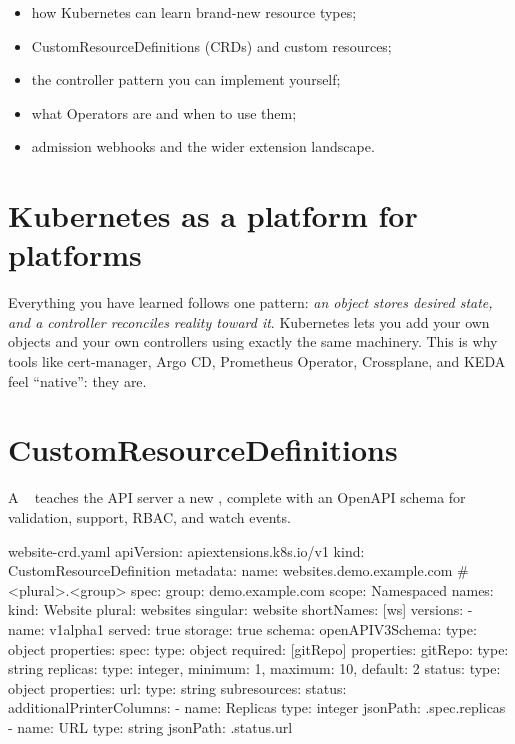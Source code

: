 
\begin{objectives}
\begin{itemize}
  \item how Kubernetes can learn brand-new resource types;
  \item CustomResourceDefinitions (CRDs) and custom resources;
  \item the controller pattern you can implement yourself;
  \item what Operators are and when to use them;
  \item admission webhooks and the wider extension landscape.
\end{itemize}
\end{objectives}

\section{Kubernetes as a platform for platforms}

Everything you have learned follows one pattern: \emph{an object stores desired
state, and a controller reconciles reality toward it}. Kubernetes lets you add
your own objects and your own controllers using exactly the same machinery. This
is why tools like cert-manager, Argo CD, Prometheus Operator, Crossplane, and
KEDA feel ``native'': they are.

\section{CustomResourceDefinitions}

A ~ teaches the API server a new , complete
with an OpenAPI schema for validation,  support, RBAC, and watch
events.

\begin{yamlcode}{website-crd.yaml}
apiVersion: apiextensions.k8s.io/v1
kind: CustomResourceDefinition
metadata:
  name: websites.demo.example.com      # <plural>.<group>
spec:
  group: demo.example.com
  scope: Namespaced
  names:
    kind: Website
    plural: websites
    singular: website
    shortNames: [ws]
  versions:
    - name: v1alpha1
      served: true
      storage: true
      schema:
        openAPIV3Schema:
          type: object
          properties:
            spec:
              type: object
              required: [gitRepo]
              properties:
                gitRepo:  { type: string }
                replicas: { type: integer, minimum: 1, maximum: 10, default: 2 }
            status:
              type: object
              properties:
                url: { type: string }
      subresources:
        status: {}
      additionalPrinterColumns:
        - name: Replicas
          type: integer
          jsonPath: .spec.replicas
        - name: URL
          type: string
          jsonPath: .status.url
\end{yamlcode}

